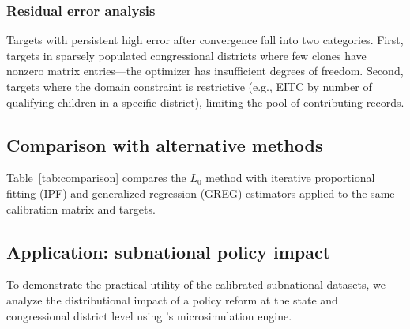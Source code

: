 \subsubsection{Residual error analysis}

Targets with persistent high error after convergence fall into two categories. First, targets in sparsely populated congressional districts where few clones have nonzero matrix entries---the optimizer has insufficient degrees of freedom. Second, targets where the domain constraint is restrictive (e.g., EITC by number of qualifying children in a specific district), limiting the pool of contributing records.

\subsection{Comparison with alternative methods}

Table~\ref{tab:comparison} compares the $L_0$ method with iterative proportional fitting (IPF) and generalized regression (GREG) estimators applied to the same calibration matrix and targets.




\subsection{Application: subnational policy impact}

To demonstrate the practical utility of the calibrated subnational datasets, we analyze the distributional impact of a policy reform at the state and congressional district level using \policyengine{}'s microsimulation engine.

